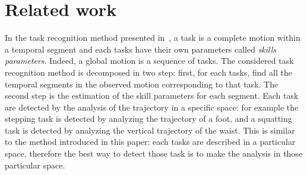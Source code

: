 \documentclass[letterpaper, 10pt, conference]{ieeeconf}      %
\begin{document}
\section{Related work}
In the task recognition method presented in~\cite{nakaoka07}, a task is
a complete motion within a temporal segment and each tasks have their own
parameters called \emph{skills parameters}. Indeed, a global motion is a sequence of
tasks. The considered task recognition method is decomposed in two step: 
first, for each tasks, find all the temporal segments in the observed motion
corresponding to that task.
The second step is the estimation of the skill parameters for each segment.
Each task are detected by the analysis of the trajectory in a specific space:
for example the stepping task is detected by analyzing the trajectory  of a foot,
and a squatting task is detected by analyzing the vertical trajectory of the waist.
This is similar to the method introduced in this paper: each tasks are described in a particular
space, therefore the best way to detect those task is to make the analysis in
those particular space.
\end{document}
